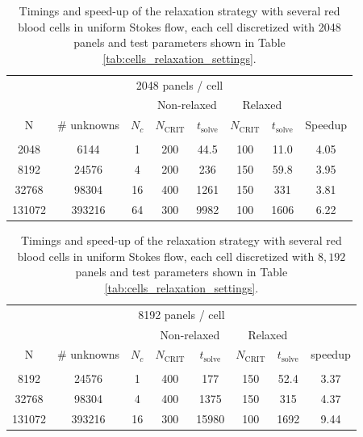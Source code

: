 \documentclass[final,leqno,]{siamltex1213}
\newcommand{\ncrit}{N_{\text{CRIT}}}
\newcommand{\tsolve}{t_{\text{solve}}}
\begin{document}
\begin{table}[htdp]
\footnotesize
\begin{center}
\begin{tabular}{c|c|c|cc|cc|c}
\multicolumn{8}{c}{2048 panels / cell} \\
& & & \multicolumn{2}{c}{Non-relaxed} & \multicolumn{2}{c}{Relaxed}\\
N & \# unknowns & $N_c$ & $\ncrit$ & $\tsolve$ & $\ncrit$ & $\tsolve$ & Speedup \\ \hline
& & & & & & &  \\
2048 & 6144 & 1 & 200 & 44.5 & 100 & 11.0 & 4.05 \\ 
8192 & 24576 & 4 & 200 & 236 & 150 & 59.8 & 3.95 \\ 
32768 & 98304 & 16 & 400 & 1261 & 150 & 331 & 3.81 \\
131072 & 393216 & 64 & 300 & 9982\footnotemark[1] & 100 & 1606 & 6.22\footnotemark[1] \\
\end{tabular}
\end{center}
\caption{Timings and speed-up of the relaxation strategy with several red blood cells in uniform Stokes flow, each cell discretized with 2048 panels and test parameters shown in Table \ref{tab:cells_relaxation_settings}.}
\label{tab:multiple_cell_relaxation_results_2048}
\end{table}


\begin{table}[htdp]
\footnotesize
\begin{center}
\begin{tabular}{c|c|c|cc|cc|c}
\multicolumn{8}{c}{8192 panels / cell} \\
& & &  \multicolumn{2}{c}{Non-relaxed} & \multicolumn{2}{c}{Relaxed}\\
N & \# unknowns & $N_c$ & $\ncrit$ & $\tsolve$ & $\ncrit$ & $\tsolve$ & speedup \\ \hline
& & & & & & &  \\
8192 & 24576 & 1 & 400 & 177 & 150 & 52.4 & 3.37 \\ 
32768 & 98304 & 4 & 400 & 1375 & 150 & 315 & 4.37 \\
131072 & 393216 & 16 & 300 & 15980\footnotemark[1] & 100 & 1692 & 9.44\footnotemark[1] \\
\end{tabular}
\end{center}
\caption{Timings and speed-up of the relaxation strategy with several red blood cells in uniform Stokes flow, each cell discretized with $8,192$ panels and test parameters shown in Table \ref{tab:cells_relaxation_settings}.}
\label{tab:multiple_cell_relaxation_results_8192}
\end{table}
\end{document}
